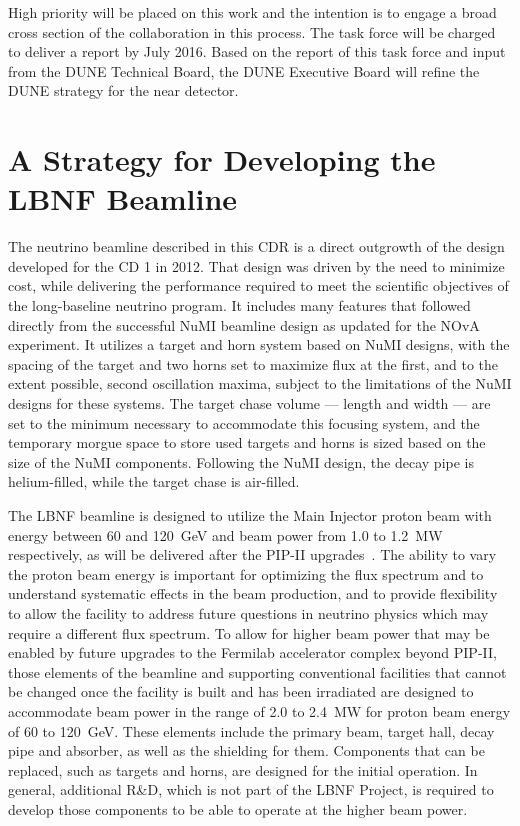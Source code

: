 High priority will be placed on this work and the intention is to engage a broad 
cross section of the collaboration in this process. The task force will be charged 
to deliver a report by July 2016. Based on the report of this task force and input 
from the DUNE Technical Board, the DUNE Executive Board will refine the DUNE strategy 
for the near detector.

\section{A Strategy for Developing the LBNF Beamline}
 
The neutrino beamline described in this CDR is a direct outgrowth of the design~\cite{lbnecdr} developed for the 
CD 1 in 2012.  That design was driven by the need to minimize cost, while delivering the performance required to meet the scientific objectives of the long-baseline neutrino program.  It includes many features that followed directly from the 
successful NuMI beamline design as updated for the NOvA experiment.  It utilizes a target and horn system based on NuMI designs, with the spacing of the target and two horns set to maximize flux at the first, and to the extent possible, second 
oscillation maxima, subject to the limitations of  the NuMI designs for these systems.  The target chase volume --- length and width --- are set to the minimum necessary to accommodate this focusing system, and the temporary morgue space to store 
used targets and horns is sized based on the size of the NuMI components.  Following the NuMI design, the decay pipe is helium-filled, while the target chase is air-filled.  
 
The LBNF beamline is designed to utilize the Main Injector proton beam with energy between 60 and 120~GeV and beam power from 1.0 to 1.2~MW respectively, as will be delivered after the PIP-II upgrades~\cite{pip2-2013}.  The ability to vary the 
proton beam energy is important for optimizing the flux spectrum and to understand systematic effects in the beam production, and to provide flexibility to allow the facility to address future questions in neutrino physics which may require a 
different flux spectrum.  To allow for higher beam power that may be enabled by future upgrades to the Fermilab accelerator complex beyond PIP-II, those elements of the beamline and supporting conventional facilities that cannot be changed once 
the facility is built and has been irradiated are designed to accommodate beam power in the range of 2.0 to 2.4~MW for proton beam energy of 60 to 120~GeV.  These elements include the primary beam, target hall, decay pipe and absorber, as 
well as the shielding for them.  Components that can be replaced, such as targets and horns, are designed for the  initial operation.  In general, additional R\&D, which is not part of the LBNF Project, is required to develop those components to be able to operate at the higher beam power.
 
